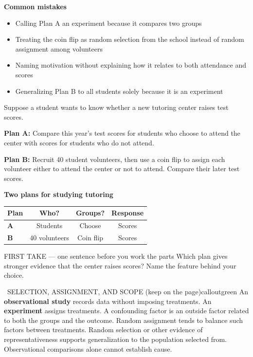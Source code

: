 \documentclass[11pt]{article}
\begin{document}
\textbf{Common mistakes}
\begin{itemize}[leftmargin=1.5em,itemsep=2pt,topsep=2pt]
  \item Calling Plan A an experiment because it compares two groups
  \item Treating the coin flip as random selection from the school instead of random assignment among volunteers
  \item Naming motivation without explaining how it relates to both attendance and scores
  \item Generalizing Plan B to all students solely because it is an experiment
\end{itemize}

\clearpage
{}

Suppose a student wants to know whether a new tutoring center raises test scores.\par\smallskip \textbf{Plan A:} Compare this year's test scores for students who choose to attend the center with scores for students who do not attend.\par \textbf{Plan B:} Recruit 40 student volunteers, then use a coin flip to assign each volunteer either to attend the center or not to attend. Compare their later test scores.\par
\begin{center}
\textbf{Two plans for studying tutoring}\par\smallskip
\begin{tabular}{|l|c|c|c|}
\hline
\textbf{Plan} & \textbf{Who?} & \textbf{Groups?} & \textbf{Response} \\ \hline
\textbf{A} & Students & Choose & Scores \\ \hline
\textbf{B} & 40 volunteers & Coin flip & Scores \\ \hline
\end{tabular}
\end{center}
\begin{firsttakebox}{FIRST TAKE --- one sentence before you work the parts}
Which plan gives stronger evidence that the center raises scores? Name the feature behind your choice.\par
{}
\end{firsttakebox}

\begin{callout}{\IconBook\ SELECTION, ASSIGNMENT, AND SCOPE (keep on the page)}{calloutgreen}
An \textbf{observational study} records data without imposing treatments. An \textbf{experiment} assigns treatments. A confounding factor is an outside factor related to both the groups and the outcome. Random assignment tends to balance such factors between treatments. Random selection or other evidence of representativeness supports generalization to the population selected from. Observational comparisons alone cannot establish cause.
\end{callout}
\end{document}
